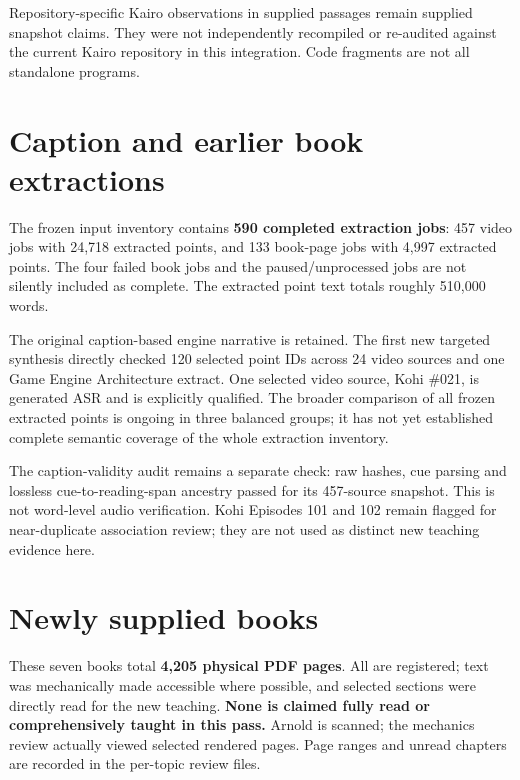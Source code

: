 Repository-specific Kairo observations in supplied passages remain supplied snapshot claims. They were not independently recompiled or re-audited against the current Kairo repository in this integration. Code fragments are not all standalone programs.

\section{Caption and earlier book extractions}\label{appendix-3b67654799a2-caption-and-earlier-book-extractions}

The frozen input inventory contains \textbf{590 completed extraction jobs}: 457 video jobs with 24,718 extracted points, and 133 book-page jobs with 4,997 extracted points. The four failed book jobs and the paused/unprocessed jobs are not silently included as complete. The extracted point text totals roughly 510,000 words.

The original caption-based engine narrative is retained. The first new targeted synthesis directly checked 120 selected point IDs across 24 video sources and one Game Engine Architecture extract. One selected video source, Kohi \#021, is generated ASR and is explicitly qualified. The broader comparison of all frozen extracted points is ongoing in three balanced groups; it has not yet established complete semantic coverage of the whole extraction inventory.

The caption-validity audit remains a separate check: raw hashes, cue parsing and lossless cue-to-reading-span ancestry passed for its 457-source snapshot. This is not word-level audio verification. Kohi Episodes 101 and 102 remain flagged for near-duplicate association review; they are not used as distinct new teaching evidence here.

\section{Newly supplied books}\label{appendix-3b67654799a2-newly-supplied-books}

These seven books total \textbf{4,205 physical PDF pages}. All are registered; text was mechanically made accessible where possible, and selected sections were directly read for the new teaching. \textbf{None is claimed fully read or comprehensively taught in this pass.} Arnold is scanned; the mechanics review actually viewed selected rendered pages. Page ranges and unread chapters are recorded in the per-topic review files.

